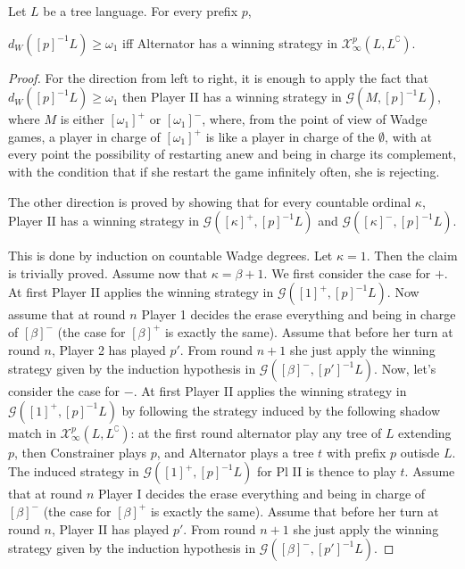 \documentclass{llncs}
\begin{document}
\begin{proposition}\label{prop:infinity} Let $L$ be a tree language. For every prefix $p$,

$d_W([p]^{-1}L) \geq \omega_1$ iff Alternator has a winning strategy in $\mathcal{X}^p_\infty(L, L^\complement)$. 

\end{proposition}
\begin{proof}
For the direction from left to right, it is enough to apply the fact that $d_W([p]^{-1}L) \geq \omega_1$ then Player II has a winning strategy in $\mathcal{G}(M, [p]^{-1}L)$, where $M$ is either $[\omega_1]^+$ or $[\omega_1]^-$, 
where, from the point of view of Wadge games, a player in charge of $[\omega_1]^+$ 
is like a player in charge of the $\emptyset$, with at every point the possibility of restarting anew and being in charge its complement, with the condition that if she restart the game infinitely often, she is rejecting.
%


The other direction is proved by showing that for every countable ordinal $\kappa$, Player II has a winning strategy in $\mathcal{G}([\kappa]^+, [p]^{-1}L)$ and $\mathcal{G}([\kappa]^-, [p]^{-1}L)$.

This is done by induction on countable Wadge degrees.
Let $\kappa=1$. Then the claim is trivially proved.
Assume now that $\kappa= \beta + 1$. We first consider the case for $+$. At first Player II applies the winning strategy in $\mathcal{G}([1]^+, [p]^{-1}L)$. Now assume that at round $n$ Player 1 decides the erase everything and being in charge of $[\beta]^-$ (the case for $[\beta]^+$ is exactly the same). Assume that before her turn at round $n$, Player 2 has played $p'$. From round $n+1$ she just apply the winning strategy given by the induction hypothesis in $\mathcal{G}([\beta]^-, [p']^{-1}L)$. Now, let's consider the case for $-$. At first Player II applies the winning strategy in $\mathcal{G}([1]^+, [p]^{-1}L)$ by following the strategy induced by the following shadow match in $\mathcal{X}^p_\infty(L, L^\complement)$: at the first round alternator play any tree of $L$ extending $p$, then Constrainer plays $p$, and Alternator plays a tree $t$ with prefix $p$ outisde $L$. The induced strategy in $\mathcal{G}([1]^+, [p]^{-1}L)$ for Pl II is thence to play $t$. 
Assume that at round $n$ Player I decides the erase everything and being in charge of $[\beta]^-$ (the case for $[\beta]^+$ is exactly the same). Assume that before her turn at round $n$, Player II has played $p'$. From round $n+1$ she just apply the winning strategy given by the induction hypothesis in $\mathcal{G}([\beta]^-, [p']^{-1}L)$.
\end{proof}
\end{document}
